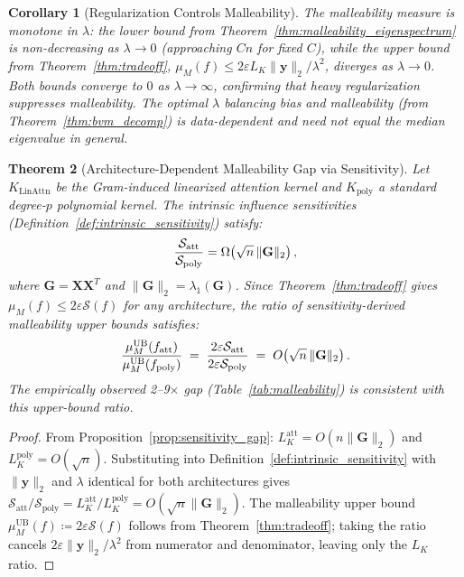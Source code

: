 \documentclass{article}
\theoremstyle{plain}
\newtheorem{theorem}{Theorem}[section]
\newtheorem{corollary}[theorem]{Corollary}
\theoremstyle{definition}
\theoremstyle{remark}
\begin{document}
\begin{corollary}[Regularization Controls Malleability]
\label{cor:regularization_malleability}
The malleability measure is monotone in $\lambda$: the lower bound from Theorem~\ref{thm:malleability_eigenspectrum} is non-decreasing as $\lambda \to 0$ (approaching $Cn$ for fixed $C$), while the upper bound from Theorem~\ref{thm:tradeoff}, $\mu_M(f) \leq 2\varepsilon L_K \|\mathbf{y}\|_2/\lambda^2$, diverges as $\lambda \to 0$. Both bounds converge to $0$ as $\lambda \to \infty$, confirming that heavy regularization suppresses malleability. The optimal $\lambda$ balancing bias and malleability (from Theorem~\ref{thm:bvm_decomp}) is data-dependent and need not equal the median eigenvalue in general.
\end{corollary}

\begin{theorem}[Architecture-Dependent Malleability Gap via Sensitivity]
\label{thm:malleability_gap_poly}
Let $K_{\text{LinAttn}}$ be the Gram-induced linearized attention kernel and $K_{\text{poly}}$ a standard degree-$p$ polynomial kernel. The intrinsic influence sensitivities (Definition~\ref{def:intrinsic_sensitivity}) satisfy:
$$\frac{\mathcal{S}_{\textup{att}}}{\mathcal{S}_{\textup{poly}}} = \Omega\!\left(\sqrt{n}\,\|\mathbf{G}\|_2\right),$$
where $\mathbf{G} = \mathbf{X}\mathbf{X}^T$ and $\|\mathbf{G}\|_2 = \lambda_1(\mathbf{G})$. Since Theorem~\ref{thm:tradeoff} gives $\mu_M(f) \leq 2\varepsilon\mathcal{S}(f)$ for any architecture, the ratio of sensitivity-derived malleability upper bounds satisfies:
$$\frac{\mu_M^{\textup{UB}}(f_{\textup{att}})}{\mu_M^{\textup{UB}}(f_{\textup{poly}})} \;=\; \frac{2\varepsilon\mathcal{S}_{\textup{att}}}{2\varepsilon\mathcal{S}_{\textup{poly}}} \;=\; O\!\left(\sqrt{n}\,\|\mathbf{G}\|_2\right).$$
The empirically observed 2--9$\times$ gap (Table~\ref{tab:malleability}) is consistent with this upper-bound ratio.
\end{theorem}

\begin{proof}
From Proposition~\ref{prop:sensitivity_gap}: $L_K^{\text{att}} = O(n\|\mathbf{G}\|_2)$ and $L_K^{\text{poly}} = O(\sqrt{n})$. Substituting into Definition~\ref{def:intrinsic_sensitivity} with $\|\mathbf{y}\|_2$ and $\lambda$ identical for both architectures gives $\mathcal{S}_{\text{att}}/\mathcal{S}_{\text{poly}} = L_K^{\text{att}}/L_K^{\text{poly}} = O(\sqrt{n}\|\mathbf{G}\|_2)$. The malleability upper bound $\mu_M^{\text{UB}}(f) \coloneq 2\varepsilon\mathcal{S}(f)$ follows from Theorem~\ref{thm:tradeoff}; taking the ratio cancels $2\varepsilon\|\mathbf{y}\|_2/\lambda^2$ from numerator and denominator, leaving only the $L_K$ ratio.
\end{proof}
\end{document}
